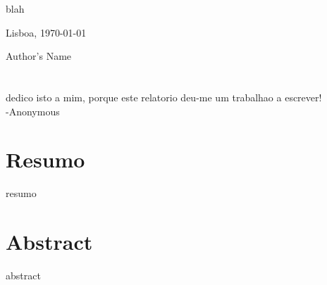 blah


\vfill
\begin{flushright}
  \begin{minipage}{8cm}
    \begin{center}
      Lisboa, \today

      Author's Name
    \end{center}
  \end{minipage}
\end{flushright}

\newpage
\thispagestyle{empty}

\cleardoublepage


\chapter*{}
\thispagestyle{empty}

\vfill
\mbox{}
\vfill\large
\begin{flushright}
  \begin{minipage}{8cm}
    \begin{center}

dedico isto a mim, porque este relatorio deu-me um trabalhao a escrever!\\
-Anonymous

    \end{center}
  \end{minipage}
\end{flushright}
\normalsize\vfill
\newpage
\thispagestyle{empty}

\cleardoublepage



\chapter*{Resumo}
\thispagestyle{empty}

resumo

\newpage
\thispagestyle{empty}

\chapter*{Abstract}
\thispagestyle{empty}

abstract


